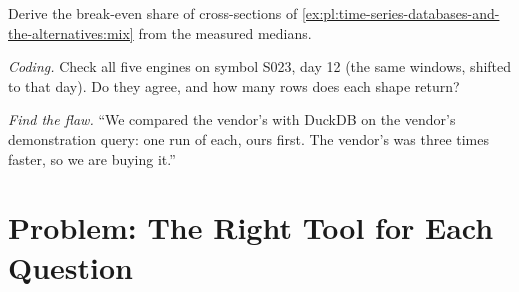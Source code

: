 \begin{exercise}[$\star\star$]\label{exo:pl:time-series-databases-and-the-alternatives:6}
Derive the break-even share of cross-sections of \cref{ex:pl:time-series-databases-and-the-alternatives:mix} from the measured
medians.
\end{exercise}

\begin{exercise}[$\star\star\star$]\label{exo:pl:time-series-databases-and-the-alternatives:7}
\emph{Coding.} Check all five engines on symbol S023, day 12 (the same windows, shifted to that day). Do they agree, and how many
rows does each shape return?
\end{exercise}

\begin{exercise}[$\star\star\star$]\label{exo:pl:time-series-databases-and-the-alternatives:8}
\emph{Find the flaw.} ``We compared the vendor's  with DuckDB on the vendor's demonstration query: one run of
each, ours first. The vendor's was three times faster, so we are buying it.''
\end{exercise}

\section{Problem: The Right Tool for Each Question}


